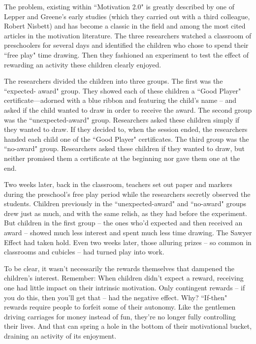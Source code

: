 The problem, existing within ``Motivation 2.0" is greatly described by one of Lepper and Greene’s early studies (which they carried out with a third colleague, Robert Nisbett) and has become a classic in the field and among the most cited articles in the motivation literature. The three researchers watched a classroom of preschoolers for several days and identified the children who chose to spend their ``free play" time drawing. Then they fashioned an experiment to test the effect of rewarding an activity these children clearly enjoyed.

The researchers divided the children into three groups. The first was the ``expected- award" group. They showed each of these children a ``Good Player" certificate—adorned with a blue ribbon and featuring the child’s name -- and asked if the child wanted to draw in order to receive the award. The second group was the ``unexpected-award" group. Researchers asked these children simply if they wanted to draw. If they decided to, when the session ended, the researchers handed each child one of the ``Good Player" certificates. The third group was the ``no-award" group. Researchers asked these children if they wanted to draw, but neither promised them a certificate at the beginning nor gave them one at the end.

Two weeks later, back in the classroom, teachers set out paper and markers during the preschool’s free play period while the researchers secretly observed the students. Children previously in the ``unexpected-award" and ``no-award" groups drew just as much, and with the same relish, as they had before the experiment. But children in the first group -- the ones who’d expected and then received an award -- showed much less interest and spent much less time drawing. The Sawyer Effect had taken hold. Even two weeks later, those alluring prizes -- so common in classrooms and cubicles -- had turned play into work.

To be clear, it wasn’t necessarily the rewards themselves that dampened the children’s interest. Remember: When children didn’t expect a reward, receiving one had little impact on their intrinsic motivation. Only contingent rewards -- if you do this, then you’ll get that -- had the negative effect. Why? ``If-then" rewards require people to forfeit some of their autonomy. Like the gentlemen driving carriages for money instead of fun, they’re no longer fully controlling their lives. And that can spring a hole in the bottom of their motivational bucket, draining an activity of its enjoyment.

